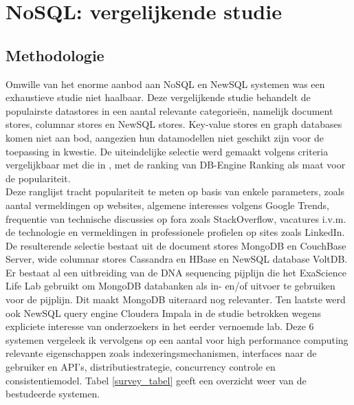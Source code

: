 \chapter{NoSQL: vergelijkende studie}
\label{nosql_survey}

\section{Methodologie}

Omwille van het enorme aanbod aan NoSQL en NewSQL systemen was een exhaustieve studie niet haalbaar. Deze vergelijkende studie behandelt de populairste datastores in een aantal relevante categorie\"en, namelijk document stores, columnar stores en NewSQL stores. Key-value stores en graph databases komen niet aan bod, aangezien hun datamodellen niet geschikt zijn voor de toepassing in kwestie. De uiteindelijke selectie werd gemaakt volgens criteria vergelijkbaar met die in \cite{grolinger2013data}, met de ranking van DB-Engine Ranking \cite{db_engine_rank} als maat voor de populariteit.\\

Deze ranglijst tracht populariteit te meten op basis van enkele parameters, zoals aantal vermeldingen op websites, algemene interesses volgens Google Trends, frequentie van technische discussies op fora zoals StackOverflow, vacatures i.v.m. de technologie en vermeldingen in professionele profielen op sites zoals LinkedIn. De resulterende selectie bestaat uit de document stores MongoDB en CouchBase Server, wide columnar stores Cassandra en HBase en NewSQL database VoltDB. Er bestaat al een uitbreiding van de DNA sequencing pijplijn die het ExaScience Life Lab gebruikt om MongoDB  databanken als in- en/of uitvoer te gebruiken voor de pijplijn. Dit maakt MongoDB uiteraard nog relevanter. Ten laatste werd ook NewSQL query engine Cloudera Impala in de studie betrokken wegens expliciete interesse van onderzoekers in het eerder vernoemde lab. Deze 6 systemen vergeleek ik 
vervolgens op een aantal voor high performance computing relevante eigenschappen zoals indexeringsmechanismen, interfaces naar de gebruiker en API's, distributiestrategie, concurrency controle en consistentiemodel. Tabel \ref{survey_tabel} geeft een overzicht weer van de bestudeerde systemen.

\begin{landscape}

\label{survey_tabel}
\end{landscape}

